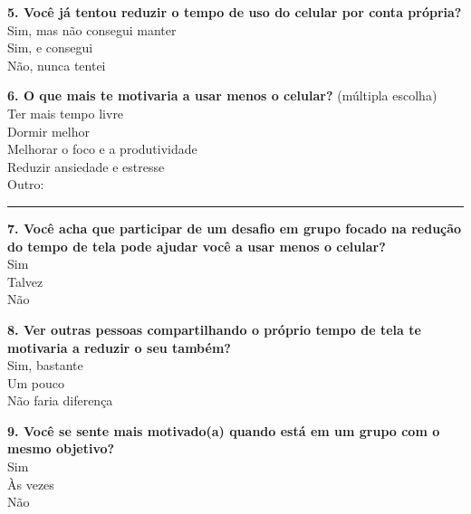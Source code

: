 \begin{questionframe}
\vspace{0.5cm}

\textbf{5. Você já tentou reduzir o tempo de uso do celular por conta própria?}\\
\opcao Sim, mas não consegui manter\\
\opcao Sim, e consegui\\
\opcao Não, nunca tentei

\vspace{0.5cm}

\textbf{6. O que mais te motivaria a usar menos o celular?} (múltipla escolha)\\
\opcao Ter mais tempo livre\\
\opcao Dormir melhor\\
\opcao Melhorar o foco e a produtividade\\
\opcao Reduzir ansiedade e estresse\\
\opcao Outro: \rule{7cm}{0.4pt}

\vspace{0.7cm}

\textbf{7. Você acha que participar de um desafio em grupo focado na redução do tempo de tela pode ajudar você a usar menos o celular?}\\
\opcao Sim\\
\opcao Talvez\\
\opcao Não

\vspace{0.5cm}

\textbf{8. Ver outras pessoas compartilhando o próprio tempo de tela te motivaria a reduzir o seu também?}\\
\opcao Sim, bastante\\
\opcao Um pouco\\
\opcao Não faria diferença

\vspace{0.5cm}

\textbf{9. Você se sente mais motivado(a) quando está em um grupo com o mesmo objetivo?}\\
\opcao Sim\\
\opcao Às vezes\\
\opcao Não


\end{questionframe}
